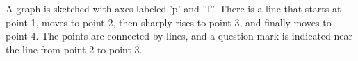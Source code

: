 A graph is sketched with axes labeled 'p' and 'T'. There is a line that starts at point 1, moves to point 2, then sharply rises to point 3, and finally moves to point 4. The points are connected by lines, and a question mark is indicated near the line from point 2 to point 3.